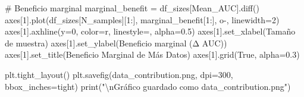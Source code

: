 \documentclass[
  doc,
  floatsintext,
  longtable,
  a4paper,
  nolmodern,
  notxfonts,
  notimes,
  12pt,
  colorlinks=true,linkcolor=blue,citecolor=blue,urlcolor=blue]{apa7}
\newenvironment{Shaded}{\begin{snugshade}}{\end{snugshade}}
\newcommand{\BuiltInTok}[1]{\textcolor[rgb]{0.00,0.23,0.31}{#1}}
\newcommand{\CharTok}[1]{\textcolor[rgb]{0.13,0.47,0.30}{#1}}
\newcommand{\CommentTok}[1]{\textcolor[rgb]{0.37,0.37,0.37}{#1}}
\newcommand{\DecValTok}[1]{\textcolor[rgb]{0.68,0.00,0.00}{#1}}
\newcommand{\FloatTok}[1]{\textcolor[rgb]{0.68,0.00,0.00}{#1}}
\newcommand{\NormalTok}[1]{\textcolor[rgb]{0.00,0.23,0.31}{#1}}
\newcommand{\OperatorTok}[1]{\textcolor[rgb]{0.37,0.37,0.37}{#1}}
\newcommand{\StringTok}[1]{\textcolor[rgb]{0.13,0.47,0.30}{#1}}
\newcommand{\VariableTok}[1]{\textcolor[rgb]{0.07,0.07,0.07}{#1}}
\begin{document}
\begin{Shaded}
\begin{Highlighting}[]
\CommentTok{\# Beneficio marginal}
\NormalTok{marginal\_benefit }\OperatorTok{=}\NormalTok{ df\_sizes[}\StringTok{\textquotesingle{}Mean\_AUC\textquotesingle{}}\NormalTok{].diff()}
\NormalTok{axes[}\DecValTok{1}\NormalTok{].plot(df\_sizes[}\StringTok{\textquotesingle{}N\_samples\textquotesingle{}}\NormalTok{][}\DecValTok{1}\NormalTok{:], marginal\_benefit[}\DecValTok{1}\NormalTok{:], }
            \StringTok{\textquotesingle{}o{-}\textquotesingle{}}\NormalTok{, linewidth}\OperatorTok{=}\DecValTok{2}\NormalTok{)}
\NormalTok{axes[}\DecValTok{1}\NormalTok{].axhline(y}\OperatorTok{=}\DecValTok{0}\NormalTok{, color}\OperatorTok{=}\StringTok{\textquotesingle{}r\textquotesingle{}}\NormalTok{, linestyle}\OperatorTok{=}\StringTok{\textquotesingle{}{-}{-}\textquotesingle{}}\NormalTok{, alpha}\OperatorTok{=}\FloatTok{0.5}\NormalTok{)}
\NormalTok{axes[}\DecValTok{1}\NormalTok{].set\_xlabel(}\StringTok{\textquotesingle{}Tamaño de muestra\textquotesingle{}}\NormalTok{)}
\NormalTok{axes[}\DecValTok{1}\NormalTok{].set\_ylabel(}\StringTok{\textquotesingle{}Beneficio marginal (Δ AUC)\textquotesingle{}}\NormalTok{)}
\NormalTok{axes[}\DecValTok{1}\NormalTok{].set\_title(}\StringTok{\textquotesingle{}Beneficio Marginal de Más Datos\textquotesingle{}}\NormalTok{)}
\NormalTok{axes[}\DecValTok{1}\NormalTok{].grid(}\VariableTok{True}\NormalTok{, alpha}\OperatorTok{=}\FloatTok{0.3}\NormalTok{)}

\NormalTok{plt.tight\_layout()}
\NormalTok{plt.savefig(}\StringTok{\textquotesingle{}data\_contribution.png\textquotesingle{}}\NormalTok{, dpi}\OperatorTok{=}\DecValTok{300}\NormalTok{, bbox\_inches}\OperatorTok{=}\StringTok{\textquotesingle{}tight\textquotesingle{}}\NormalTok{)}
\BuiltInTok{print}\NormalTok{(}\StringTok{"}\CharTok{\textbackslash{}n}\StringTok{Gráfico guardado como \textquotesingle{}data\_contribution.png\textquotesingle{}"}\NormalTok{)}


\end{Highlighting}
\end{Shaded}
\end{document}
